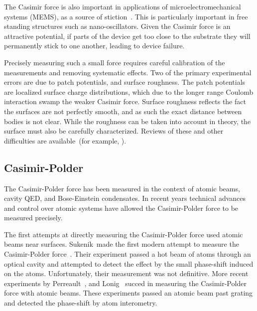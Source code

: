 The Casimir force is also important in applications of microelectromechanical systems (MEMS), 
as a source of stiction~\cite{Tas1996, Serry1998, Buks2001}.  This is particularly important
in free standing structures such as nano-oscillators.  
Given the Casimir force is an attractive potential, if parts of the device get too close to the substrate
they will permanently stick to one another, leading to device failure.  

Precisely measuring such a small force requires careful calibration of the measurements 
and removing systematic effects.  Two of the primary experimental errors are due to 
patch potentials, and surface roughness.  The patch potentials are localized surface 
charge distributions, which due to the longer range Coulomb interaction swamp the weaker
Casimir force.  Surface roughness reflects the fact the surfaces are not perfectly smooth,
and as such the exact distance between bodies is not clear.  While the roughness can be taken into
account in theory, the surface must also be carefully characterized.  Reviews of these and other 
difficulties are available~(for example, \cite{Dalvit2011}).

\subsection{Casimir-Polder}
The Casimir-Polder force has been measured in the context of atomic beams, cavity QED, and 
Bose-Einstein condensates.  
In recent years technical advances and control over atomic systems have allowed the Casimir-Polder
force to be measured precisely.  

    The first attempts at directly measuring the Casimir-Polder force used atomic beams 
    near surfaces.  
    Sukenik~\etal made the first modern attempt to measure the Casimir-Polder force~\cite{Sukenik1993}.
    Their experiment passed a hot beam of atoms through an optical cavity and attempted to detect
    the effect by the small phase-shift induced on the atoms.  Unfortunately, their measurement 
    was not definitive.
    More recent experiments by Perreault~\etal\cite{Perreault2005}, and Lonig~\etal\cite{Lonij2009} succed in measuring
    the Casimir-Polder force with atomic beams.  These experiments passed an atomic beam past grating and 
    detected the phase-shift by atom interometry.  %

